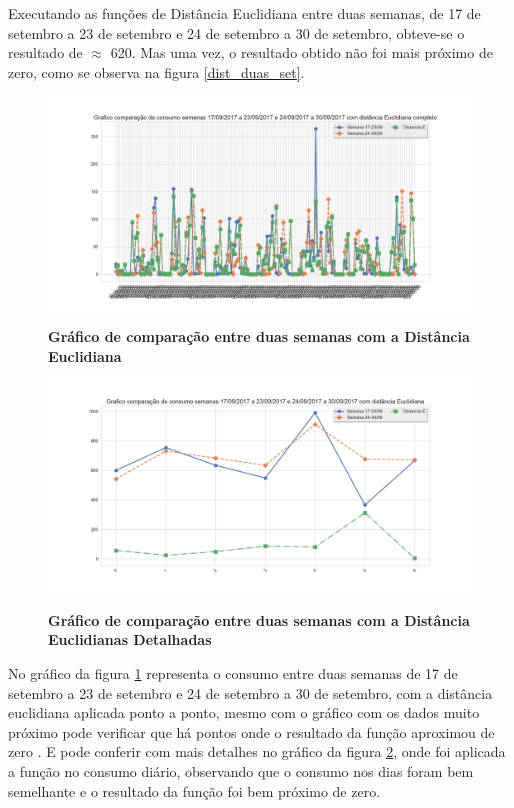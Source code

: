\par Executando as funções de Distância Euclidiana entre duas semanas, de 17 de setembro a 23 de setembro e 24 de setembro a 30 de setembro, obteve-se o resultado de  $\approx$ 620. Mas uma vez, o resultado obtido não foi mais próximo de zero, como se observa na figura  \ref{dist_duas_set}.

\begin{figure}[ht]
	\caption{\textbf{Gráfico de comparação entre duas semanas com a Distância Euclidiana}}
	\centering
		\includegraphics[width=\textwidth,height=\textheight , keepaspectratio]{figuras/Comparacaodesemanas17a23-09e24a30-09comdistanciacompleto}
		\label{dist_duas_set_comp}
\end{figure}

\begin{figure}[ht]
	\caption{\textbf{Gráfico de comparação entre duas semanas com a Distância Euclidianas Detalhadas}}
	\centering
		\includegraphics[width=\textwidth,height=\textheight , keepaspectratio]{figuras/Comparacaodesemanas17a23-09e24a30-09comdistancia}
		\label{dist_duas_set_deta}
\end{figure}

\par No gráfico da figura \ref{dist_duas_set_comp} representa o consumo entre duas semanas de 17 de setembro a 23 de setembro e 24 de setembro a 30 de setembro, com a distância euclidiana aplicada ponto a ponto, mesmo com o gráfico com  os dados muito próximo pode verificar que há pontos onde o resultado da função aproximou de zero . E pode conferir com mais detalhes no gráfico da figura \ref{dist_duas_set_deta}, onde foi aplicada a função no consumo diário, observando que o consumo nos dias foram bem semelhante e o resultado da função foi bem próximo de zero. 

